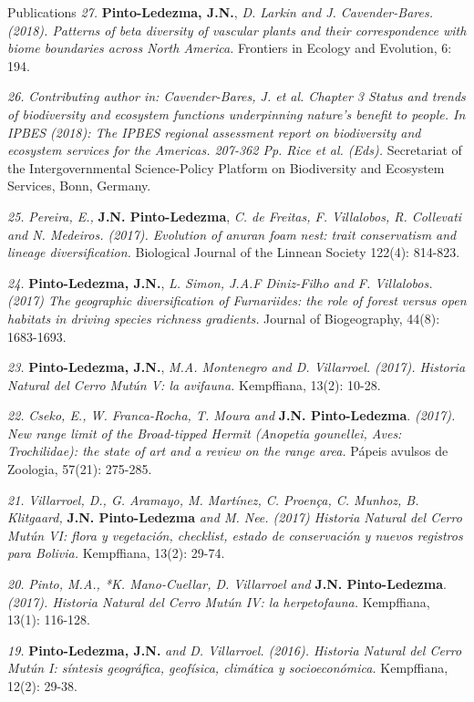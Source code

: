 \documentclass{resume} %
\begin{document}
\begin{rSection}{Publications}
{\em 27.} {\bf{Pinto-Ledezma, J.N.}}, {\em D. Larkin and J. Cavender-Bares. (2018). Patterns of beta diversity of vascular plants and their correspondence with biome boundaries across North America.} {Frontiers in Ecology and Evolution, 6: 194}.

{\em 26.} {\em Contributing author in: Cavender-Bares, J. et al. Chapter 3 Status and trends of biodiversity and ecosystem functions underpinning nature’s benefit to people. In IPBES (2018): {\em The IPBES regional assessment report on biodiversity and ecosystem services for the Americas}. 207-362 Pp. Rice et al. (Eds).} {Secretariat of the Intergovernmental Science-Policy Platform on Biodiversity and Ecosystem Services, Bonn, Germany}. 

{\em 25.} {\em Pereira, E.,} {\bf{J.N. Pinto-Ledezma}}, {\em C. de Freitas, F. Villalobos, R. Collevati and N. Medeiros. (2017). Evolution of anuran foam nest: trait conservatism and lineage diversification.} {Biological Journal of the Linnean Society 122(4): 814-823}. 

{\em 24.} {\bf{Pinto-Ledezma, J.N.}}, {\em L. Simon, J.A.F Diniz-Filho and F. Villalobos. (2017) The geographic diversification of Furnariides: the role of forest versus open habitats in driving species richness gradients.} {Journal of Biogeography, 44(8): 1683-1693}. 

{\em 23.} {\bf{Pinto-Ledezma, J.N.}}, {\em M.A. Montenegro and D. Villarroel. (2017). Historia Natural del Cerro Mutún V: la avifauna.} {Kempffiana, 13(2): 10-28}.

{\em 22.} {\em Cseko, E., W. Franca-Rocha, T. Moura and} {\bf{J.N. Pinto-Ledezma}}. {\em (2017). New range limit of the Broad-tipped Hermit ({\em Anopetia gounellei}, Aves: Trochilidae): the state of art and a review on the range area.} {Pápeis avulsos de Zoologia, 57(21): 275-285}. 

{\em 21.} {\em Villarroel, D., G. Aramayo, M. Martínez, C. Proença, C. Munhoz, B. Klitgaard,} {\bf{J.N. Pinto-Ledezma}} {\em and M. Nee. (2017) Historia Natural del Cerro Mutún VI: flora y vegetación, checklist, estado de conservación y nuevos registros para Bolivia.} {Kempffiana, 13(2): 29-74}.

{\em 20.} {\em *Pinto, M.A., *K. Mano-Cuellar, D. Villarroel and} {\bf{J.N. Pinto-Ledezma}}. {\em (2017). Historia Natural del Cerro Mutún IV: la herpetofauna.} {Kempffiana, 13(1): 116-128}.

{\em 19.} {\bf{Pinto-Ledezma, J.N.}} {\em and D. Villarroel. (2016). Historia Natural del Cerro Mutún I: síntesis geográfica, geofísica, climática y socioeconómica.} {Kempffiana, 12(2): 29-38}.


\end{rSection}
\end{document}
